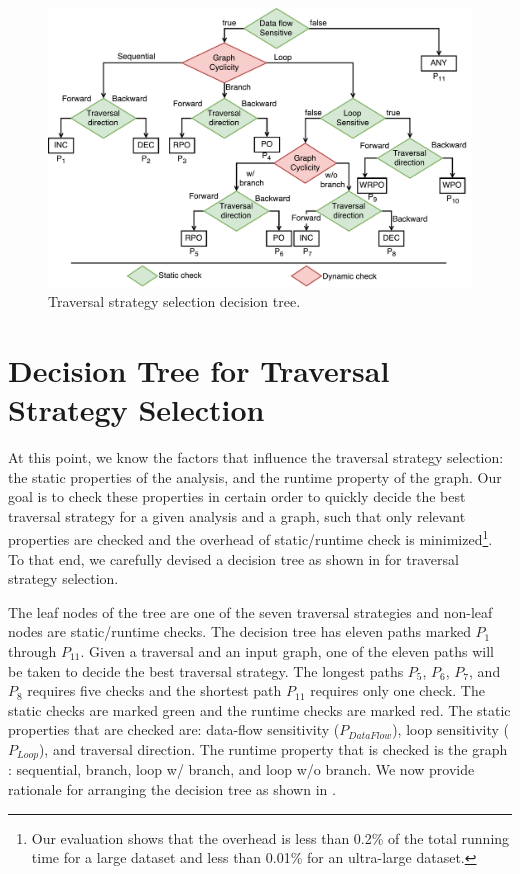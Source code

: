 \begin{figure}[ht!]
\centering
\includegraphics[width=1\linewidth]{figures/decision.pdf}
\caption{Traversal strategy selection decision tree.}
\label{fig:decision-diagram}
\end{figure}

\section{Decision Tree for Traversal Strategy Selection}
\label{sec:decision-tree}
At this point, we know the factors that influence the traversal strategy
selection: the static properties of the analysis, and the runtime property of
the graph. Our goal is to check these properties in certain order to quickly
decide the best traversal strategy for a given analysis and a graph, such that
only relevant properties are checked and the overhead of static/runtime check is
minimized\footnote{Our evaluation shows that the overhead is less than 0.2\% 
of the total running time for a large dataset and less than 0.01\% for an ultra-large dataset.}.
To that end, we carefully devised a decision tree as shown in
 for traversal strategy selection.

The leaf nodes of the tree are one of the seven traversal strategies
and non-leaf nodes are static/runtime checks. The decision tree has eleven paths
marked $P_1$ through $P_{11}$. Given a traversal and an input graph, one of the
eleven paths will be taken to decide the best traversal strategy. The longest
paths $P_5$, $P_6$, $P_7$, and $P_8$ requires five checks and the shortest path
$P_{11}$ requires only one check. The static checks are marked green and the
runtime checks are marked red. The static properties that are checked are:
data-flow sensitivity ($P_{DataFlow}$), loop sensitivity ($P_{Loop}$), and
traversal direction. The runtime property that is checked is the graph
\graphprop{}: sequential, branch, loop w/ branch, and loop w/o branch. We now
provide rationale for arranging the decision tree as shown in
.

